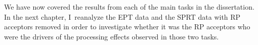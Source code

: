 We have now covered the results from each of the main tasks in the dissertation. In the next chapter, I~reanalyze the EPT data and the SPRT data with RP acceptors removed in order to investigate whether it was the RP acceptors who were the drivers of the processing effects observed in those two tasks.